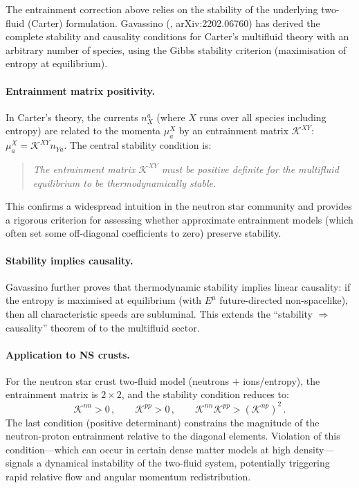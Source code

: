 The entrainment correction above relies on the stability of the
underlying two-fluid (Carter) formulation.
Gavassino (\citealt{GavassinoCarter2022}, arXiv:2202.06760) has
derived the complete stability and causality conditions for Carter's
multifluid theory with an arbitrary number of species, using the
Gibbs stability criterion (maximisation of entropy at equilibrium).

\paragraph{Entrainment matrix positivity.}
In Carter's theory, the currents $n_X^a$ (where $X$ runs over all
species including entropy) are related to the momenta $\mu^X_a$ by an
entrainment matrix $\mathcal{K}^{XY}$:
$\mu^X_a = \mathcal{K}^{XY} n_{Ya}$.
The central stability condition is:
\begin{quote}
\textit{The entrainment matrix $\mathcal{K}^{XY}$ must be positive
definite for the multifluid equilibrium to be thermodynamically stable.}
\end{quote}
This confirms a widespread intuition in the neutron star community and
provides a rigorous criterion for assessing whether approximate
entrainment models (which often set some off-diagonal coefficients to
zero) preserve stability.

\paragraph{Stability implies causality.}
Gavassino further proves that thermodynamic stability implies linear
causality: if the entropy is maximised at equilibrium (with $E^\mu$
future-directed non-spacelike), then all characteristic speeds are
subluminal.  This extends the ``stability $\Rightarrow$ causality''
theorem of \citet{GavassinoCausality2021} to the multifluid sector.

\paragraph{Application to NS crusts.}
For the neutron star crust two-fluid model (neutrons + ions/entropy),
the entrainment matrix is $2 \times 2$, and the stability condition
reduces to:
\begin{equation}
\label{eq:rel-60-carter-stability}
\mathcal{K}^{nn} > 0\,,\qquad
\mathcal{K}^{pp} > 0\,,\qquad
\mathcal{K}^{nn}\mathcal{K}^{pp} > (\mathcal{K}^{np})^2\,.
\end{equation}
The last condition (positive determinant) constrains the magnitude of
the neutron-proton entrainment relative to the diagonal elements.
Violation of this condition---which can occur in certain dense matter
models at high density---signals a dynamical instability of the
two-fluid system, potentially triggering rapid relative flow and
angular momentum redistribution.
